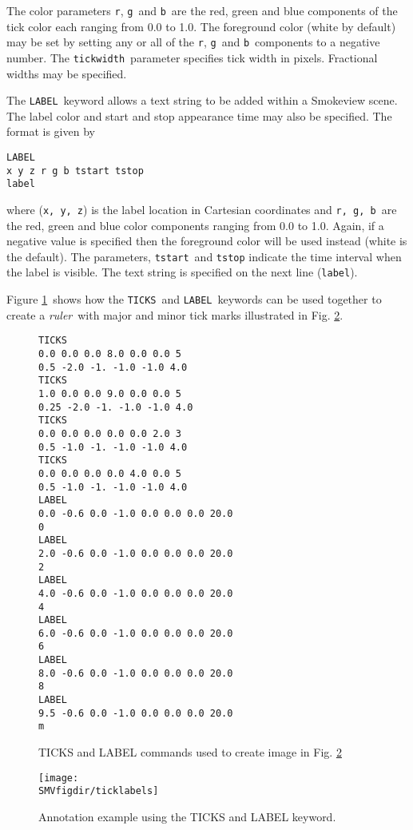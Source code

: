 \documentclass[11pt,twoside]{book}
\begin{document}
The color parameters {\tt r}, {\tt g}\ and {\tt b}\ are the
red, green and blue components of the tick color each
ranging from 0.0 to 1.0. The foreground color (white by
default) may be set by setting any or all of the {\tt r},
{\tt g}\ and {\tt b}\ components to a negative number. The
{\tt tickwidth}\ parameter specifies tick width in pixels.
Fractional widths may be specified.

The {\tt LABEL}\ keyword allows a text string to be added
within a Smokeview scene.  The label color and start and
stop appearance time may also be specified. The format is
given by

\begin{lstlisting}
LABEL
x y z r g b tstart tstop
label
\end{lstlisting}

\noindent where ({\tt x, y, z}) is the label location in Cartesian
coordinates and {\tt r, g, b}\ are the red, green and blue color
components ranging from 0.0 to 1.0.  Again, if a negative value is
specified then the foreground color will be used instead (white is
the default).  The parameters, {\tt tstart}\ and {\tt tstop}
indicate the time interval when the label is visible. The text
string is specified on the next line ({\tt label}).

Figure \ref{figticklabels}\ shows how the {\tt TICKS}\ and
{\tt LABEL}\ keywords can be used together to create a
{\em ruler}\ with major and minor tick marks illustrated in Fig.
\ref{figticklabelexample}.

\begin{figure}[bph]
{\small
\begin{lstlisting}
TICKS
0.0 0.0 0.0 8.0 0.0 0.0 5
0.5 -2.0 -1. -1.0 -1.0 4.0
TICKS
1.0 0.0 0.0 9.0 0.0 0.0 5
0.25 -2.0 -1. -1.0 -1.0 4.0
TICKS
0.0 0.0 0.0 0.0 0.0 2.0 3
0.5 -1.0 -1. -1.0 -1.0 4.0
TICKS
0.0 0.0 0.0 0.0 4.0 0.0 5
0.5 -1.0 -1. -1.0 -1.0 4.0
LABEL
0.0 -0.6 0.0 -1.0 0.0 0.0 0.0 20.0
0
LABEL
2.0 -0.6 0.0 -1.0 0.0 0.0 0.0 20.0
2
LABEL
4.0 -0.6 0.0 -1.0 0.0 0.0 0.0 20.0
4
LABEL
6.0 -0.6 0.0 -1.0 0.0 0.0 0.0 20.0
6
LABEL
8.0 -0.6 0.0 -1.0 0.0 0.0 0.0 20.0
8
LABEL
9.5 -0.6 0.0 -1.0 0.0 0.0 0.0 20.0
m
\end{lstlisting}
}
\caption{ TICKS and LABEL commands used to create image in Fig. \ref{figticklabelexample}}
\label{figticklabels}%
\end{figure}

\begin{figure}[bph]
\begin{center}
\texttt{[image: \\SMVfigdir/ticklabels]}
\end{center}
\caption{ Annotation example using the TICKS and LABEL keyword. }
\label{figticklabelexample}%
\end{figure}
\end{document}
